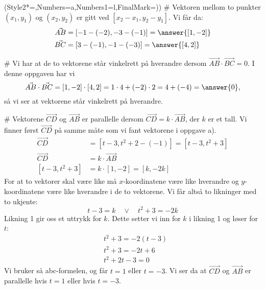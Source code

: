 \begin{easylist}[enumerate]
	\ListProperties(Style2*=,Numbers=a,Numbers1=l,FinalMark={)})
	# Vektoren mellom to punkter $(x_1, y_1)$ og $(x_2, y_2)$ er gitt ved $[x_2 - x_1, y_2 - y_1]$. Vi får da: 
	\begin{align*}
		\vec{AB} &= [-1-(-2), -3-(-1)] = \answer{[1,-2]} \\
		\vec{BC} &= [3-(-1),-1-(-3)] = \answer{[4,2]}
	\end{align*}
	
	# Vi har at de to vektorene står vinkelrett på hverandre dersom $\vec{AB} \cdot \vec{BC} = 0$.
	I denne oppgaven har vi
	\begin{equation*}
		\vec{AB} \cdot \vec{BC} = [1,-2] \cdot [4,2] = 1 \cdot 4 + (-2) \cdot 2 = 4 + (-4) = \answer{0},
	\end{equation*} 
	så vi ser at vektorene står vinkelrett på hverandre.
	
	# Vektorene $\vec{CD}$ og $\vec{AB}$ er parallelle dersom $\vec{CD} = k \cdot \vec{AB}$, der $k$ er et tall. 
	Vi finner først $\vec{CD}$ på samme måte som vi fant vektorene i oppgave a). 
	\begin{align*}
		\vec{CD} &= [t-3,t^2 + 2- (-1)] = [t-3,t^2 + 3] \\
		\vec{CD} & = k \cdot \vec{AB}\\
		[t-3,t^2 + 3] & = k \cdot [1,-2]  = [k,-2k]
	\end{align*}
	For at to vektorer skal være like må $x$-koordinatene være like hverandre og $y$-koordinatene være like hverandre i de to vektorene. 
	Vi får altså to likninger med to ukjente: 
	\begin{equation*}
		t-3 = k \quad \vee \quad t^2 + 3 = -2k 
	\end{equation*}
	Likning 1 gir oss et uttrykk for $k$. 
	Dette setter vi inn for $k$ i likning 1 og løser for $t$:
	\begin{align*}
			&t^2 + 3  = -2(t-3)\\
			&t^2 + 3  = -2t + 6\\
			&t^2 +2t -3 = 0   
	\end{align*}
	Vi bruker så abc-formelen, og får $t = 1$ eller $t=-3$.
	Vi ser da at $\vec{CD}$ og $\vec{AB}$ er parallelle hvis $t = 1$ eller hvis $t = -3$.
\end{easylist}

